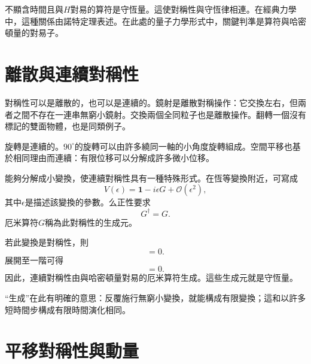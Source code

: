 \begin{classroomqa}
\end{classroomqa}

不顯含時間且與\(H\)對易的算符是守恆量。這使對稱性與守恆律相連。在經典力學中，這種關係由諾特定理表述。在此處的量子力學形式中，關鍵判準是算符與哈密頓量的對易子。

\section{離散與連續對稱性}

對稱性可以是離散的，也可以是連續的。鏡射是離散對稱操作：它交換左右，但兩者之間不存在一連串無窮小鏡射。交換兩個全同粒子也是離散操作。翻轉一個沒有標記的雙面物體，也是同類例子。

旋轉是連續的。\(90^\circ\)的旋轉可以由許多繞同一軸的小角度旋轉組成。空間平移也基於相同理由而連續：有限位移可以分解成許多微小位移。

能夠分解成小變換，使連續對稱性具有一種特殊形式。在恆等變換附近，可寫成
\begin{equation}
V(\epsilon)
=
\mathbf 1-i\epsilon G+\mathcal O(\epsilon^2),
\end{equation}
其中\(\epsilon\)是描述該變換的參數。么正性要求
\begin{equation}
G^\dagger=G.
\end{equation}
厄米算符\(G\)稱為此對稱性的生成元。

若此變換是對稱性，則
\begin{equation}
[H,V(\epsilon)]=0.
\end{equation}
展開至一階可得
\begin{equation}
[H,G]=0.
\end{equation}
因此，連續對稱性由與哈密頓量對易的厄米算符生成。這些生成元就是守恆量。

``生成''在此有明確的意思：反覆施行無窮小變換，就能構成有限變換；這和以許多短時間步構成有限時間演化相同。

\section{平移對稱性與動量}

